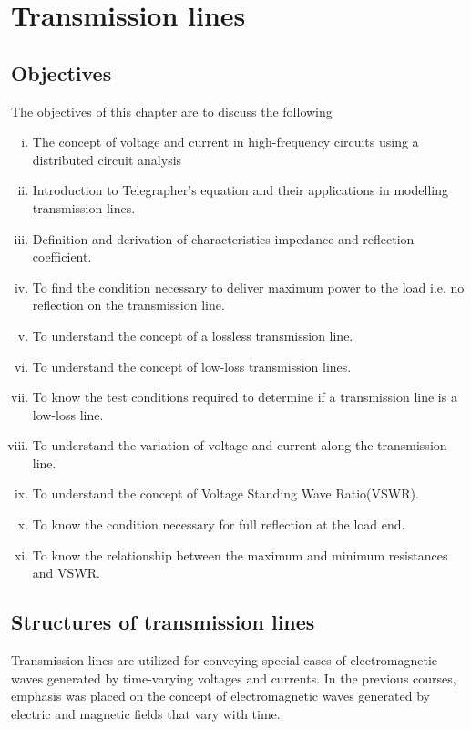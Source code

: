 \chapter{Transmission lines}\label{lec:lec2}


\begin{mdframed}[backgroundcolor=lightblue, linewidth=1pt, hidealllines=true]
\section{Objectives}
The objectives of this chapter are to discuss the following
\begin{enumerate}[(i)]
\item The concept of voltage and current in high-frequency circuits using a distributed circuit analysis
\item Introduction to Telegrapher's equation and their applications in modelling transmission lines.
\item Definition and derivation of characteristics impedance and reflection coefficient.
\item To find the condition necessary to deliver maximum power to the load i.e. no reflection on the transmission line.
\item To understand the concept of a lossless transmission line.
\item To understand the concept of low-loss transmission lines.
\item To know the test conditions required to determine if a transmission line is a low-loss line.
\item To understand the variation of voltage and current along the transmission line.
\item To understand the concept of Voltage Standing Wave Ratio(VSWR).
\item To know the condition necessary for full reflection at the load end.
\item To know the relationship between the maximum and minimum resistances and VSWR. 
\end{enumerate}
\end{mdframed}

\section{Structures of transmission lines}
Transmission lines are utilized for conveying special cases of electromagnetic waves generated by time-varying voltages and currents. In the previous courses, emphasis was placed on the concept of electromagnetic waves generated by electric and magnetic fields that vary with time.

